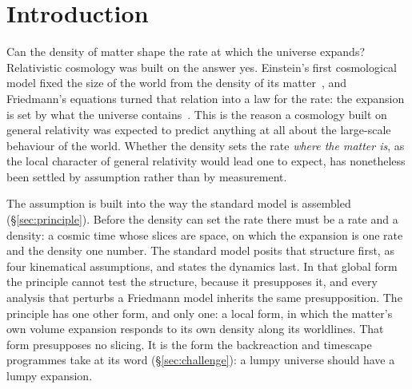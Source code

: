 \documentclass[11pt,a4paper]{article}
\begin{document}
\begin{abstract}
defended in 1920 by Eddington in the declared absence of any experimental knowledge on cosmical scales. This is the empirical counterpart of the conceptual results of the companion papers~\cite{JanzenCRframework, JanzenBHcausality}: as stellar parallax converted the Earth's motion from an interpretive option into a measured fact, the isotropy of the cosmological redshift converts the cosmic foliation from a modelling convenience into a measured feature of the world.
\end{abstract}

\section{Introduction}\label{sec:intro}

Can the density of matter shape the rate at which the universe expands? Relativistic cosmology was built on the answer yes. Einstein's first cosmological model fixed the size of the world from the density of its matter~\cite{Einstein1917}, and Friedmann's equations turned that relation into a law for the rate: the expansion is set by what the universe contains~\cite{Friedmann1922, Friedmann1924}. This is the reason a cosmology built on general relativity was expected to predict anything at all about the large-scale behaviour of the world. Whether the density sets the rate \emph{where the matter is}, as the local character of general relativity would lead one to expect, has nonetheless been settled by assumption rather than by measurement.

The assumption is built into the way the standard model is assembled (\S\ref{sec:principle}). Before the density can set the rate there must be a rate and a density: a cosmic time whose slices are space, on which the expansion is one rate and the density one number. The standard model posits that structure first, as four kinematical assumptions, and states the dynamics last. In that global form the principle cannot test the structure, because it presupposes it, and every analysis that perturbs a Friedmann model inherits the same presupposition. The principle has one other form, and only one: a local form, in which the matter's own volume expansion responds to its own density along its worldlines. That form presupposes no slicing. It is the form the backreaction and timescape programmes take at its word (\S\ref{sec:challenge}): a lumpy universe should have a lumpy expansion.
\end{document}
